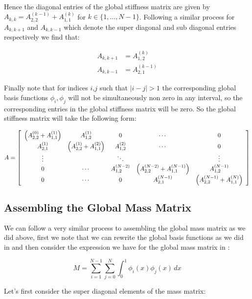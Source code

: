 Hence the diagonal entries of the global stiffness matrix are given by $A_{k,k}
= A^{(k-1)}_{2,2} + A^{(k)}_{1,1}$ for $k \in \{1, \ldots, N - 1\}$. Following
a similar process for $A_{k,k+1}$ and $A_{k,k-1}$ which denote the super
diagonal and sub diagonal entries respectively we find that:

\begin{align*}
    A_{k,k+1} &= A^{(k)}_{1,2} \\
    A_{k,k-1} &= A^{(k-1)}_{2,1}
\end{align*}

Finally note that for indices $i$,$j$ such that $|i - j| > 1$ the corresponding
global basis functions $\phi_i, \phi_j$ will not be simultaneously non zero in
any interval, so the corresponding entries in the global stiffness matrix will
be zero. So the global stiffness matrix will take the following form:

\begin{equation}\label{eq:oned-deterministic-global-stiffness}
    A = \left[\begin{array}{c c c c c}
         \left(A^{(0)}_{2,2} + A^{(1)}_{1,1}\right) & A^{(1)}_{1,2} & 0 & \cdots & 0 \\
         A^{(1)}_{2,1} & \left(A^{(1)}_{2,2} + A^{(2)}_{1,1}\right) & A^{(2)}_{1,2} & \cdots & 0 \\
         \vdots & & \ddots  & & \vdots \\
         0 & \cdots & A^{(N-2)}_{1,2} & \left(A^{(N-2)}_{2,2} + A^{(N-1)}_{1,1}\right)& A^{(N-1)}_{1,2} \\
         0 & \cdots & 0 & A^{(N-1)}_{2,1} & \left(A^{(N-1)}_{2,2} + A^{(N)}_{1,1}\right)
        \end{array}\right]
\end{equation}

\subsection{Assembling the Global Mass Matrix}

We can follow a very similar process to assembling the global mass matrix as we
did above, first we note that we can rewrite the global basis functions as we
did in  and then consider the
expression we have for the global mass matrix in
:

\[
    M = \sum_{i=1}^{N-1}\sum_{j=0}^N\int_0^1\phi_i(x)\phi_j(x)\, dx
\]

Let's first consider the super diagonal elements of the mass matrix:

